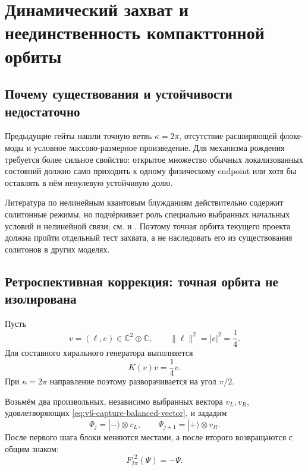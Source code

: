 \chapter{Динамический захват и неединственность компакттонной орбиты}
\label{ch:v6-spectral-transition-discrete-compacton-dynamical-capture-gate}

\section{Почему существования и устойчивости недостаточно}

Предыдущие гейты нашли точную ветвь $\kappa=2\pi$, отсутствие расширяющей
флоке-моды и условное массово-размерное произведение. Для механизма
рождения требуется более сильное свойство: открытое множество обычных
локализованных состояний должно само приходить к одному физическому
endpoint или хотя бы оставлять в нём ненулевую устойчивую долю.

Литература по нелинейным квантовым блужданиям действительно содержит
солитонные режимы, но подчёркивает роль специально выбранных начальных
условий и нелинейной связи; см.  и
. Поэтому точная орбита текущего проекта должна
пройти отдельный тест захвата, а не наследовать его из существования
солитонов в других моделях.

\section{Ретроспективная коррекция: точная орбита не изолирована}

Пусть
\begin{equation}
 v=(\ell,e)\in\mathbb C^2\oplus\mathbb C,
 \qquad
 \|\ell\|^2=|e|^2=\frac14.
 \label{eq:v6-capture-balanced-vector}
\end{equation}
Для составного хирального генератора выполняется
\begin{equation}
 K(v)v=\frac14v.
\end{equation}
При $\kappa=2\pi$ направление поэтому разворачивается на угол $\pi/2$.

Возьмём два произвольных, независимо выбранных вектора $v_L,v_R$,
удовлетворяющих \eqref{eq:v6-capture-balanced-vector}, и зададим
\begin{equation}
 \Psi_j=|{-}\rangle\otimes v_L,
 \qquad
 \Psi_{j+1}=|{+}\rangle\otimes v_R.
 \label{eq:v6-capture-general-two-site-family}
\end{equation}
После первого шага блоки меняются местами, а после второго возвращаются с
общим знаком:
\begin{equation}
 \boxed{F_{2\pi}^{,2}(\Psi)=-\Psi}.
 \label{eq:v6-capture-family-return-law}
\end{equation}

